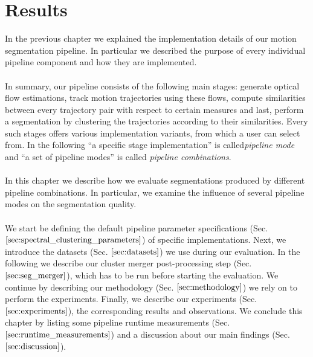 \chapter{Results}
In the previous chapter we explained the implementation details of our motion segmentation pipeline. In particular we described the purpose of every individual pipeline component and how they are implemented. \\ \\
In summary, our pipeline consists of the following main stages: generate optical flow estimations, track motion trajectories using these flows, compute similarities between every trajectory pair with respect to certain measures and last, perform a segmentation by clustering the trajectories according to their similarities. Every such stages offers various implementation variants, from which a user can select from.  
In the following \enquote{a specific stage implementation} is called\textit{pipeline mode} and \enquote{a set of pipeline modes} is called \textit{pipeline combinations}. \\ \\
In this chapter we describe how we evaluate segmentations produced by different pipeline combinations. In particular, we examine the influence of several pipeline modes on the segmentation quality. \\ \\
We start be defining the default pipeline parameter specifications (Sec. $\ref{sec:spectral_clustering_parameters}$) of specific implementations. Next, we introduce the datasets (Sec. $\ref{sec:datasets}$) we use during our evaluation. In the following we describe our cluster merger post-processing step (Sec. $\ref{sec:seg_merger}$), which has to be run before starting the evaluation. We continue by describing our methodology (Sec. $\ref{sec:methodology}$) we rely on to perform the experiments. Finally, we describe our experiments (Sec. $\ref{sec:experiments}$), the corresponding results and observations. We conclude this chapter by listing some pipeline runtime measurements (Sec. $\ref{sec:runtime_measurements}$) and a discussion about our main findings (Sec. $\ref{sec:discussion}$). 

